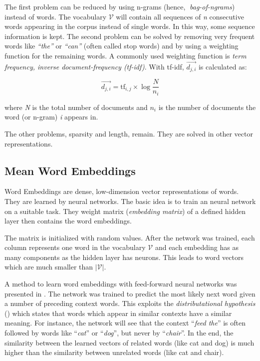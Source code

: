 The first problem can be reduced by using n-grams (hence, \emph{bag-of-ngrams}) instead of words. The vocabulary $\mathcal{V}$ will contain all sequences of \emph{n} consecutive words appearing in the corpus instead of single words. In this way, some sequence information is kept. The second problem can be solved by removing very frequent words like \emph{\enquote{the}} or \emph{\enquote{can}} (often called stop words) and by using a weighting function for the remaining words. A commonly used weighting function is \emph{term frequency, inverse document-frequency (tf-idf)}. With tf-idf, $\vec{d_{j,i}}$ is calculated as:

\[\vec{d_{j,i}} = \text{tf}_{i,j} \times \log{ \frac{N}{n_i} } \]

where \emph{N} is the total number of documents and $n_i$ is the number of documents the word (or n-gram) \emph{i} appears in.

The other problems, sparsity and length, remain. They are solved in other vector representations.


\subsection{Mean Word Embeddings}
Word Embeddings are dense, low-dimension vector representations of words. They are learned by neural networks. The basic idea is to train an neural network on a suitable task. They weight matrix (\emph{embedding matrix}) of a defined hidden layer then contains the word embeddings.

The matrix is initialized with random values. After the network was trained, each column represents one word in the vocabulary $\mathcal{V}$ and each embedding has as many components as the hidden layer has neurons. This leads to word vectors which are much smaller than $|\mathcal{V}|$.

A method to learn word embeddings with feed-forward neural networks was presented in \cite{bengio2003neural}. The network was trained to predict the most likely next word given a number of preceding context words. This exploits the \emph{distributational hypothesis} (\cite{harris1954distributional}) which states that words which appear in similar contexts have a similar meaning. For instance, the network will see that the context \enquote{\emph{feed the}} is often followed by words like \enquote{\emph{cat}} or \enquote{\emph{dog}}, but never by \enquote{\emph{chair}}. In the end, the similarity between the learned vectors of related words (like cat and dog) is much higher than the similarity between unrelated words (like cat and chair).

